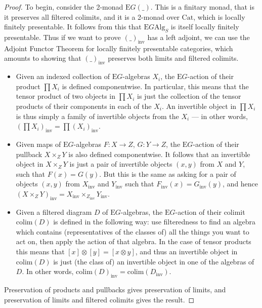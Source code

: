 \documentclass{amsart} %
\begin{document}
\begin{proof} To begin, consider the 2-monad $\mathrm{E}G(\_)$. This is a finitary monad, that is it preserves all filtered colimits, and it is a 2-monad over $\mathrm{Cat}$, which is locally finitely presentable. It follows from this that $\mathrm{E}G\mathrm{Alg}_S$ is itself locally finitely presentable. Thus if we want to prove $(\_)_{\mathrm{inv}}$ has a left adjoint, we can use the Adjoint Functor Theorem for locally finitely presentable categories, which amounts to showing that $(\_)_{\mathrm{inv}}$ preserves both limits and filtered colimits.
\begin{itemize}
\item Given an indexed collection of $\mathrm{E}G$-algebras $X_i$, the $\mathrm{E}G$-action of their product $\prod X_i$ is defined componentwise. In particular, this means that the tensor product of two objects in $\prod X_i$ is just the collection of the tensor products of their components in each of the $X_i$. An invertible object in $\prod X_i$ is thus simply a family of invertible objects from the $X_i$ --- in other words, $(\prod X_i)_{\mathrm{inv}} = \prod (X_i)_{\mathrm{inv}}$.
\item Given maps of $\mathrm{E}G$-algebras $F: X \to Z$, $G : Y \to Z$, the $\mathrm{E}G$-action of their pullback $X \times_Z Y$ is also defined componentwise. It follows that an invertible object in $X \times_Z Y$ is just a pair of invertible objects $(x, y)$ from $X$ and $Y$, such that $F(x) = G(y)$. But this is the same as asking for a pair of objects $(x, y)$ from $X_{\mathrm{inv}}$ and $Y_{\mathrm{inv}}$ such that $F_{\mathrm{inv}}(x) = G_{\mathrm{inv}}(y)$, and hence $(X \times_Z Y)_{\mathrm{inv}} = X_{\mathrm{inv}} \times_{Z_{\mathrm{inv}}} Y_{\mathrm{inv}}$.
\item Given a filtered diagram $D$ of $\mathrm{E}G$-algebras, the $\mathrm{E}G$-action of their colimit $\mathrm{colim}(D)$ is defined in the following way: use filteredness to find an algebra which contains (representatives of the classes of) all the things you want to act on, then apply the action of that algebra. In the case of tensor products this means that $[x]\otimes[y] = [x \otimes y]$, and thus an invertible object in $\mathrm{colim}(D)$ is just (the class of) an invertible object in one of the algebras of $D$. In other words, $\mathrm{colim}(D)_{\mathrm{inv}} = \mathrm{colim}(D_{\mathrm{inv}})$.
\end{itemize}
Preservation of products and pullbacks gives preservation of limits, and preservation of limits and filtered colimits gives the result.
\end{proof}
\end{document}

